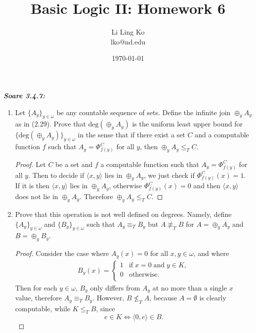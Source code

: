 \documentclass{article}
\begin{document}
\title{Basic Logic II: Homework 6}
\author{Li Ling Ko\\ lko@nd.edu}
\date{\today}
\maketitle

\it \textbf{Soare 3.4.7:}
  \begin{enumerate}[label={\bf (\alph*):}]
    \item Let $\{A_y\}_{y\in\omega}$ be any countable sequence of sets.
      Define the infinite join $\oplus_y A_y$ as in (2.29). Prove that
      $\text{deg}(\oplus_y A_y)$ is the uniform least upper bound for
      $\{\text{deg}(\oplus_y A_y)\}_{y\in\omega}$ in the sense that if
      there exist a set $C$ and a computable function $f$ such that
      $A_y=\Phi_{f(y)}^C$ for all $y$, then $\oplus_y A_y\leq_T C$.

      \begin{proof}
        Let $C$ be a set and $f$ a computable function such that
        $A_y=\Phi_{f(y)}^C$ for all $y$. Then to decide if $\langle
        x,y\rangle$ lies in $\oplus_y A_y$, we just check if
        $\Phi_{f(y)}^C(x)=1$. If it is then $\langle x,y\rangle$ lies in
        $\oplus_y A_y$, otherwise $\Phi_{f(y)}^C(x)=0$ and then $\langle
        x,y\rangle$ does not lie in $\oplus_y A_y$. Therefore $\oplus_y
        A_y\leq_T C$.
      \end{proof}

    \item Prove that this operation is not well defined on degrees. Namely,
      define $\{A_y\}_{y\in\omega}$ and  $\{B_y\}_{y\in\omega}$ such that
      $A_y \equiv_T B_y$ but $A\not\equiv_T B$ for $A=\oplus_y A_y$ and
      $B=\oplus_y B_y$.

      \begin{proof}
        Consider the case where $A_y(x)=0$ for all $x,y\in\omega$, and
        where
        \begin{align*}
          B_y(x) =
          \begin{cases}
            1 &\text{if}\; x=0\; \text{and}\; y\in K,\\
            0 &\text{otherwise}.\\
          \end{cases}
        \end{align*}
        Then for each $y\in\omega$, $B_y$ only differs from $A_y$ at no
        more than a single $x$ value, therefore $A_y\equiv_T B_y$. However,
        $B\not\leq_T A$, because $A=\emptyset$ is clearly computable,
        while $K\leq_T B$, since
        \[e\in K \Leftrightarrow \langle 0,e\rangle \in B.\]
      \end{proof}
  \end{enumerate}
\end{document}
